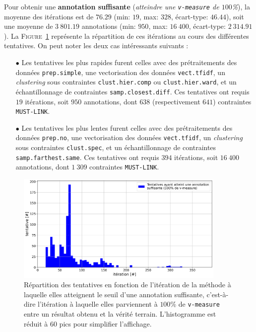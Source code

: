 			Pour obtenir une \textbf{annotation suffisante} (\textit{atteindre une \texttt{v-measure} de $100$\%}), la moyenne des itérations est de $76.29$ (min: $19$, max: $328$, écart-type: $46.44$), soit une moyenne de $3~801.19$ annotations (min: $950$, max: $16~400$, écart-type: $2~314.91$).
			La \textsc{Figure~\ref{figure:4.2.1-ETUDE-OPTIMISATION-HISTOGRAMME-ANNOTATION-SUFFISANTE}} représente la répartition de ces itérations au cours des différentes tentatives.
			On peut noter les deux cas intéressants suivants :
			\begin{itemize}
				\item[$\bullet$] Les tentatives les plus rapides furent celles avec des prétraitements des données \texttt{prep.simple}, une vectorisation des données \texttt{vect.tfidf}, un \textit{clustering} sous contraintes \texttt{clust.hier.comp} ou \texttt{clust.hier.ward}, et un échantillonnage de contraintes \texttt{samp.closest.diff}.
				Ces tentatives ont requis $19$ itérations, soit $950$ annotations, dont $638$ (respectivement $641$) contraintes \texttt{MUST-LINK}.
				\item[$\bullet$] Les tentatives les plus lentes furent celles avec des prétraitements des données \texttt{prep.no}, une vectorisation des données \texttt{vect.tfidf}, un \textit{clustering} sous contraintes \texttt{clust.spec}, et un échantillonnage de contraintes \texttt{samp.farthest.same}.
				Ces tentatives ont requis $394$ itérations, soit $16~400$ annotations, dont $1~309$ contraintes \texttt{MUST-LINK}.
			\end{itemize}
			\begin{figure}[!htb]
				\centering
				\includegraphics[width=0.90\textwidth]{figures/etude-efficience-histogramme-annotation-suffisante}
				\caption{
					Répartition des tentatives en fonction de l'itération de la méthode à laquelle elles atteignent le seuil d'une annotation suffisante, c'est-à-dire l'itération à laquelle elles parviennent à $100$\% de \texttt{v-measure} entre un résultat obtenu et la vérité terrain.
					L'histogramme est réduit à $60$ pics pour simplifier l'affichage.
				}
				\label{figure:4.2.1-ETUDE-OPTIMISATION-HISTOGRAMME-ANNOTATION-SUFFISANTE}
			\end{figure}
